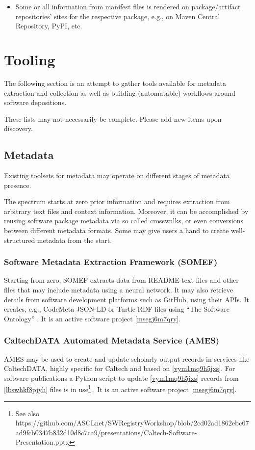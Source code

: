 \documentclass{article}
\begin{document}
\begin{itemize}  
\item Some or all information from manifest files is rendered on package/artifact repositories’ sites for the respective package, e.g., on Maven Central Repository, PyPI, etc.


\end{itemize}

\section{Tooling}\label{hwfknpnm5glj}
The following section is an attempt to gather tools available for metadata extraction and collection as well as building (automatable) workflows around software depositions.

These lists may not necessarily be complete. Please add new items upon discovery. 



\subsection{Metadata}\label{blks7s108o6}
Existing toolsets for metadata may operate on different stages of metadata presence.

The spectrum starts at zero prior information and requires extraction from arbitrary text files and context information. Moreover, it can be accomplished by reusing software package metadata via so called crosswalks, or even  conversions between different metadata formats. Some may give users a hand to create well-structured metadata from the start.



\subsubsection{Software Metadata Extraction Framework (SOMEF)}\label{qz3d8r3z48k}
Starting from zero, SOMEF \cite{11045035/AWIJVT4K} \cite{11045035/E5BAXQ4Y} extracts data from README text files and other files that may include metadata using a neural network. It may also retrieve details from software development platforms such as GitHub, using their APIs. It creates, e.g., CodeMeta JSON-LD or Turtle RDF files using “The Software Ontology” \cite{11045035/TVVPYY5L}. It is an active software project \ref{msegj6m7qry}.



\subsubsection{CaltechDATA Automated Metadata Service (AMES)}\label{v9uri13hoesk}
AMES \cite{11045035/CBYX26KG} may be used to create and update scholarly output records in services like CaltechDATA, highly specific for Caltech and based on \ref{vym1mq9h5jxs}. For software publications a Python script to update \ref{vym1mq9h5jxs} records from \ref{lbswhkf8pjyh} files is in use\footnote{See also https://github.com/ASCLnet/SWRegistryWorkshop/blob/2cd02ad1862ebc67ad9fcb0347b832d10d8c7ca9/presentations/Caltech-Software-Presentation.pptx}.. It is an active software project \ref{msegj6m7qry}.
\end{document}
